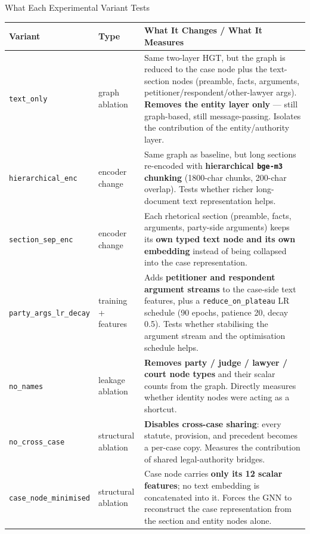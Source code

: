 \documentclass[aspectratio=169,11pt]{beamer}
\begin{document}
\begin{frame}{What Each Experimental Variant Tests}
  \tiny
  \setlength{\tabcolsep}{4pt}
  \begin{tabular}{p{2.6cm}p{2.0cm}p{8.5cm}}
    \toprule
    \textbf{Variant} & \textbf{Type} & \textbf{What It Changes / What It Measures} \\
    \midrule
    \texttt{text\_only} & graph ablation & Same two-layer HGT, but the graph is reduced to the case node plus the text-section nodes (preamble, facts, arguments, petitioner/respondent/other-lawyer args). \textbf{Removes the entity layer only} --- still graph-based, still message-passing. Isolates the contribution of the entity/authority layer. \\
    \texttt{hierarchical\_enc} & encoder change & Same graph as baseline, but long sections re-encoded with \textbf{hierarchical \texttt{bge-m3} chunking} (1800-char chunks, 200-char overlap). Tests whether richer long-document text representation helps. \\
    \texttt{section\_sep\_enc} & encoder change & Each rhetorical section (preamble, facts, arguments, party-side arguments) keeps its \textbf{own typed text node and its own embedding} instead of being collapsed into the case representation. \\
    \texttt{party\_args\_lr\_decay} & training + features & Adds \textbf{petitioner and respondent argument streams} to the case-side text features, plus a \texttt{reduce\_on\_plateau} LR schedule (90 epochs, patience 20, decay 0.5). Tests whether stabilising the argument stream and the optimisation schedule helps. \\
    \texttt{no\_names} & leakage ablation & \textbf{Removes party / judge / lawyer / court node types} and their scalar counts from the graph. Directly measures whether identity nodes were acting as a shortcut. \\
    \texttt{no\_cross\_case} & structural ablation & \textbf{Disables cross-case sharing}: every statute, provision, and precedent becomes a per-case copy. Measures the contribution of shared legal-authority bridges. \\
    \texttt{case\_node\_minimised} & structural ablation & Case node carries \textbf{only its 12 scalar features}; no text embedding is concatenated into it. Forces the GNN to reconstruct the case representation from the section and entity nodes alone. \\
    \bottomrule
  \end{tabular}
\end{frame}
\end{document}
